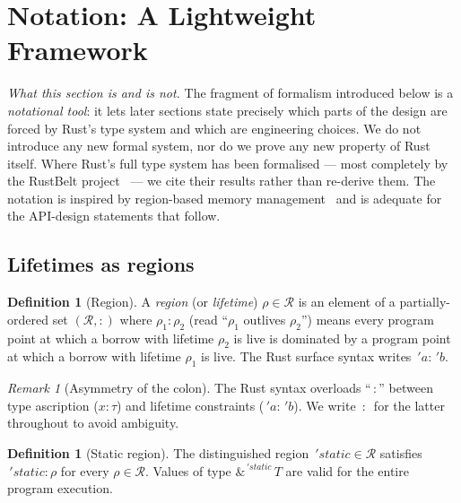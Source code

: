 \documentclass[12pt]{article}
\theoremstyle{definition}
\newtheorem{definition}[theorem]{Definition}
\theoremstyle{remark}
\newtheorem{remark}[theorem]{Remark}
\newcommand{\lifetime}[1]{\ensuremath{\,'\!#1}}
\newcommand{\borrow}[2]{\ensuremath{\&^{#1}\,#2}}
\newcommand{\outlives}{\ensuremath{:}}
\begin{document}
\section{Notation: A Lightweight Framework}
\label{sec:framework}

\noindent\textit{What this section is and is not.} The fragment of formalism
introduced below is a \emph{notational tool}: it lets later sections state
precisely which parts of the design are forced by Rust's type system and
which are engineering choices. We do not introduce any new formal system,
nor do we prove any new property of Rust itself. Where Rust's full type
system has been formalised --- most completely by the RustBelt
project~\cite{rustbelt} --- we cite their results rather than re-derive
them. The notation is inspired by region-based memory
management~\cite{tofte-talpin} and is adequate for the API-design
statements that follow.

\subsection{Lifetimes as regions}

\begin{definition}[Region]
A \emph{region} (or \emph{lifetime}) $\rho \in \mathcal{R}$ is an element of a
partially-ordered set $(\mathcal{R}, \outlives)$ where $\rho_1 \outlives \rho_2$
(read ``$\rho_1$ outlives $\rho_2$'') means every program point at which a
borrow with lifetime $\rho_2$ is live is dominated by a program point at which
a borrow with lifetime $\rho_1$ is live. The Rust surface syntax writes
$\lifetime{a} \outlives \lifetime{b}$.
\end{definition}

\begin{remark}[Asymmetry of the colon]
The Rust syntax overloads ``\,:\,'' between type ascription
($x : \tau$) and lifetime constraints ($\lifetime{a} : \lifetime{b}$). We
write \,$\outlives$\, for the latter throughout to avoid ambiguity.
\end{remark}

\begin{definition}[Static region]
The distinguished region $\lifetime{static} \in \mathcal{R}$ satisfies
$\lifetime{static} \outlives \rho$ for every $\rho \in \mathcal{R}$. Values of
type $\borrow{\lifetime{static}}{T}$ are valid for the entire program execution.
\end{definition}
\end{document}
